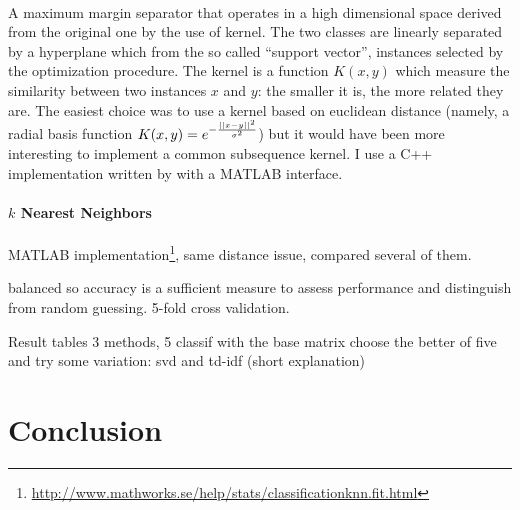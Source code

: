 \paragraph{}

A maximum margin separator that operates in a high dimensional space derived from the original one by the use of kernel. The two classes are linearly separated by a hyperplane which from the so called \enquote{support vector}, instances selected by the optimization procedure. The kernel is a function $K(x,y)$ which measure the similarity between two instances $x$ and $y$: the smaller it is, the more related they are. The easiest choice was to use a kernel based on euclidean distance (namely, a radial basis function $K(x,y)=e^{-\frac{\left|\left|x-y\right|\right|^2}{\sigma^2}}$) but it would have been more interesting to implement a common subsequence kernel. I use a C++ implementation written by \textcite{Chang2001libsvm} with a MATLAB interface.

\paragraph{$k$ Nearest Neighbors}
MATLAB implementation\footnote{\href{http://www.mathworks.se/help/stats/classificationknn.fit.html}{http://www.mathworks.se/help/stats/classificationknn.fit.html}}, same distance issue, compared several of them.

balanced so accuracy is a sufficient measure to assess performance and
distinguish from random guessing. 5-fold cross validation.


Result tables
3 methods, 5 classif with the base matrix
choose the better of five and try some variation: svd and td-idf (short
explanation)

\section{Conclusion}
